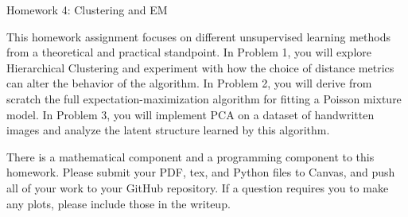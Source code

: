 \documentclass[submit]{harvardml}
\begin{document}
\begin{center}
{\Large Homework 4: Clustering and EM}\\
\end{center}


This homework assignment focuses on different unsupervised learning
methods from a theoretical and practical standpoint.  In Problem 1,
you will explore Hierarchical Clustering and experiment with how the
choice of distance metrics can alter the behavior of the algorithm. In
Problem 2, you will derive from scratch the full
expectation-maximization algorithm for fitting a Poisson mixture
model. In Problem 3, you will implement PCA on a dataset of
handwritten images and analyze the latent structure learned by this
algorithm.

There is a mathematical component and a programming component to this
homework.  Please submit your PDF, tex, and Python files to Canvas,
and push all of your work to your GitHub repository. If a question
requires you to make any plots, please include those in the writeup.

\newpage
\end{document}
